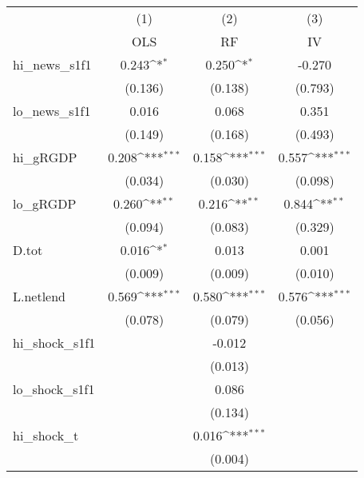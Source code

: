 {
\def\sym#1{\ifmmode^{#1}\else\(^{#1}\)\fi}
\begin{tabular}{l*{3}{c}}
\toprule
            &\multicolumn{1}{c}{(1)}&\multicolumn{1}{c}{(2)}&\multicolumn{1}{c}{(3)}\\
            &\multicolumn{1}{c}{OLS}&\multicolumn{1}{c}{RF}&\multicolumn{1}{c}{IV}\\
\midrule
hi\_news\_s1f1&       0.243\sym{*}  &       0.250\sym{*}  &      -0.270         \\
            &     (0.136)         &     (0.138)         &     (0.793)         \\
\addlinespace
lo\_news\_s1f1&       0.016         &       0.068         &       0.351         \\
            &     (0.149)         &     (0.168)         &     (0.493)         \\
\addlinespace
hi\_gRGDP    &       0.208\sym{***}&       0.158\sym{***}&       0.557\sym{***}\\
            &     (0.034)         &     (0.030)         &     (0.098)         \\
\addlinespace
lo\_gRGDP    &       0.260\sym{**} &       0.216\sym{**} &       0.844\sym{**} \\
            &     (0.094)         &     (0.083)         &     (0.329)         \\
\addlinespace
D.tot       &       0.016\sym{*}  &       0.013         &       0.001         \\
            &     (0.009)         &     (0.009)         &     (0.010)         \\
\addlinespace
L.netlend   &       0.569\sym{***}&       0.580\sym{***}&       0.576\sym{***}\\
            &     (0.078)         &     (0.079)         &     (0.056)         \\
\addlinespace
hi\_shock\_s1f1&                     &      -0.012         &                     \\
            &                     &     (0.013)         &                     \\
\addlinespace
lo\_shock\_s1f1&                     &       0.086         &                     \\
            &                     &     (0.134)         &                     \\
\addlinespace
hi\_shock\_t  &                     &       0.016\sym{***}&                     \\
            &                     &     (0.004)         &                     \\

\end{tabular}}
